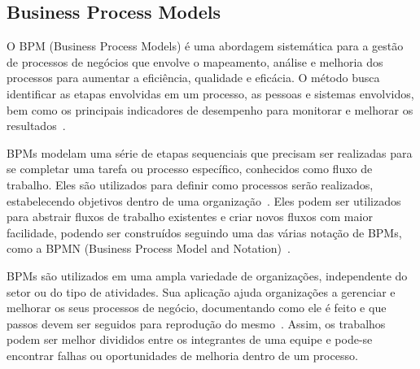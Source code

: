 \subsection{Business Process Models}


O BPM (Business Process Models) é uma abordagem sistemática para a gestão de processos de negócios que envolve o mapeamento, análise e melhoria dos processos para aumentar a eficiência, qualidade e eficácia. O método busca identificar as etapas envolvidas em um processo, as pessoas e sistemas envolvidos, bem como os principais indicadores de desempenho para monitorar e melhorar os resultados~\cite{Kueng1997GoalbasedEvaluation}.


BPMs modelam uma série de etapas sequenciais que precisam ser realizadas para se completar uma tarefa ou processo específico, conhecidos como fluxo de trabalho. Eles são utilizados para definir como processos serão realizados, estabelecendo objetivos dentro de uma organização~\cite{Alves2014UnderstandingOrganizations}. Eles podem ser utilizados para abstrair fluxos de trabalho existentes e criar novos fluxos com maior facilidade, podendo ser construídos seguindo uma das várias notação de BPMs, como a BPMN (Business Process Model and Notation)~\cite{Dijkman2008SemanticsBPMN}.



BPMs são utilizados em uma ampla variedade de organizações, independente do setor ou do tipo de atividades. Sua aplicação ajuda organizações a gerenciar e melhorar os seus processos de negócio, documentando como ele é feito e que passos devem ser seguidos para reprodução do mesmo~\cite{DaSilva2014BusinessNot}. Assim, os trabalhos podem ser melhor divididos entre os integrantes de uma equipe e pode-se encontrar falhas ou oportunidades de melhoria dentro de um processo.



